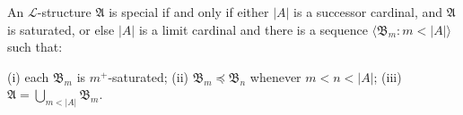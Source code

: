 An $\mathcal{L}$-structure $\mathfrak{A}$ is special if and only if either $|A|$ is a successor cardinal, and $\mathfrak{A}$ is saturated, or else $|A|$ is a limit cardinal and there is a sequence $\langle \mathfrak{B}_m : m < |A| \rangle$ such that:

(i) each $\mathfrak{B}_m$ is $m^+$-saturated;
(ii) $\mathfrak{B}_m \preceq \mathfrak{B}_n$ whenever $m < n < |A|$;
(iii) $\mathfrak{A} = \bigcup_{m < |A|} \mathfrak{B}_m$.
